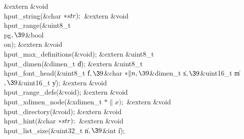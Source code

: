 \&{extern} \&{void} \\{hput\_string}(\&{char} ${}{*}\index{str+\\{str}}\\{str});{}$\6
\&{extern} \&{void} \\{hput\_range}(\&{uint8\_t} \\{pg}${},\39{}$\&{bool} \\{on});\6
\&{extern} \&{void} \\{hput\_max\_definitions}(\&{void});\6
\&{extern} \&{uint8\_t} \\{hput\_dimen}(\&{dimen\_t} \|d);\6
\&{extern} \&{uint8\_t} \\{hput\_font\_head}(\&{uint8\_t} \|f${},\39{}$\&{char} ${}{*}\|n,\39{}$\&{dimen\_t} \|s${},\39{}$\&{uint16\_t} \|m${},\39{}$\&{uint16\_t} \|y);\6
\&{extern} \&{void} \\{hput\_range\_defs}(\&{void});\6
\&{extern} \&{void} \\{hput\_xdimen\_node}(\&{xdimen\_t} ${}{*}\|x);{}$\6
\&{extern} \&{void} \\{hput\_directory}(\&{void});\6
\&{extern} \&{void} \\{hput\_hint}(\&{char} ${}{*}\index{str+\\{str}}\\{str});{}$\6
\&{extern} \&{void} \\{hput\_list\_size}(\&{uint32\_t} \|n${},\39{}$\&{int} \|i);
\Y
\fi



